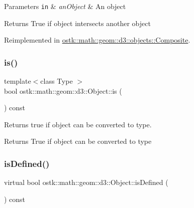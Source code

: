 \begin{DoxyParams}[1]{Parameters}
\mbox{\tt in}  & {\em an\+Object} & An object \\
\hline
\end{DoxyParams}
\begin{DoxyReturn}{Returns}
True if object intersects another object 
\end{DoxyReturn}


Reimplemented in \hyperlink{classostk_1_1math_1_1geom_1_1d3_1_1objects_1_1_composite_a1064214841e9cc22475e0683fb16bce7}{ostk\+::math\+::geom\+::d3\+::objects\+::\+Composite}.

\mbox{\label{classostk_1_1math_1_1geom_1_1d3_1_1_object_ab09a0b47da3dc0ca2d8170aced1ead15}} 
\subsubsection{\texorpdfstring{is()}{is()}}
{\footnotesize\ttfamily template$<$class Type $>$ \\
bool ostk\+::math\+::geom\+::d3\+::\+Object\+::is (\begin{DoxyParamCaption}{ }\end{DoxyParamCaption}) const\hspace{0.3cm}{\ttfamily [inline]}}



Returns true if object can be converted to type. 

\begin{DoxyReturn}{Returns}
True if object can be converted to type 
\end{DoxyReturn}
\mbox{\label{classostk_1_1math_1_1geom_1_1d3_1_1_object_a271a1964cd208be85ce9a0a429395ad8}} 
\subsubsection{\texorpdfstring{is\+Defined()}{isDefined()}}
{\footnotesize\ttfamily virtual bool ostk\+::math\+::geom\+::d3\+::\+Object\+::is\+Defined (\begin{DoxyParamCaption}{ }\end{DoxyParamCaption}) const\hspace{0.3cm}{\ttfamily [pure virtual]}}



